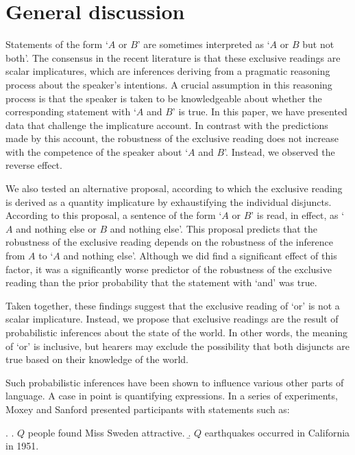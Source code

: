 \documentclass[12pt]{article}
\begin{document}
\section{General discussion}

Statements of the form `$A$ or $B$' are sometimes interpreted as `$A$ or $B$ but not both'. The consensus in the recent literature is that these exclusive readings are scalar implicatures, which are inferences deriving from a pragmatic reasoning process about the speaker's intentions. A crucial assumption in this reasoning process is that the speaker is taken to be knowledgeable about whether the corresponding statement with `$A$ and $B$' is true. In this paper, we have presented data that challenge the implicature account. In contrast with the predictions made by this account, the robustness of the exclusive reading does not increase with the competence of the speaker about `$A$ and $B$'. Instead, we observed the reverse effect.

We also tested an alternative proposal, according to which the exclusive reading is derived as
a quantity implicature by exhaustifying the individual disjuncts. According to this proposal, a
sentence of the form `$A$ or $B$' is read, in effect, as `$A$ and nothing else or $B$ and
nothing else'. This proposal predicts that the robustness of the exclusive reading depends on
the robustness of the inference from $A$ to `$A$ and nothing else'. Although we did find a
significant effect of this factor, it was a significantly worse predictor of the robustness of
the exclusive reading than the prior probability that the statement with `and' was true.

Taken together, these findings suggest that the exclusive reading of `or' is not a scalar
implicature. Instead, we propose that exclusive readings are the result of probabilistic
inferences about the state of the world. In other words, the meaning of `or' is inclusive, but
hearers may exclude the possibility that both disjuncts are true based on their knowledge of
the world.

Such probabilistic inferences have been shown to influence various other parts of language. A case in point is quantifying expressions. In a series of experiments, Moxey and Sanford \citeyearpar{moxey1993} presented participants with statements such as:

\ex.	\a. $Q$ people found Miss Sweden attractive.
	\b. $Q$ earthquakes occurred in California in 1951.
	
\end{document}
